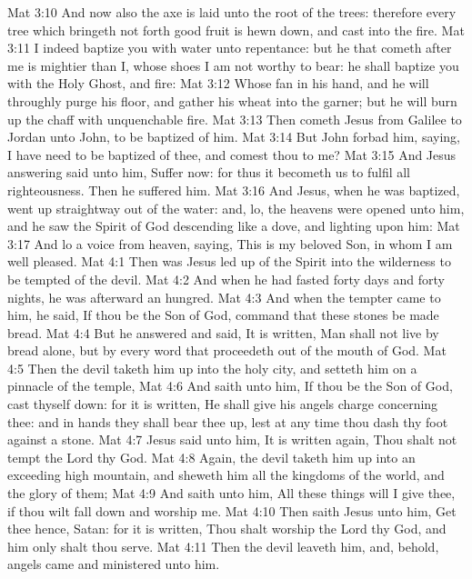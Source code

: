 \vs Mat 3:10 And now also the axe is laid unto the root of the trees: therefore every tree which bringeth not forth good fruit is hewn down, and cast into the fire.
\vs Mat 3:11 I indeed baptize you with water unto repentance: but he that cometh after me is mightier than I, whose shoes I am not worthy to bear: he shall baptize you with the Holy Ghost, and  fire:
\vs Mat 3:12 Whose fan  in his hand, and he will throughly purge his floor, and gather his wheat into the garner; but he will burn up the chaff with unquenchable fire.
\vs Mat 3:13 Then cometh Jesus from Galilee to Jordan unto John, to be baptized of him.
\vs Mat 3:14 But John forbad him, saying, I have need to be baptized of thee, and comest thou to me?
\vs Mat 3:15 And Jesus answering said unto him, Suffer  now: for thus it becometh us to fulfil all righteousness. Then he suffered him.
\vs Mat 3:16 And Jesus, when he was baptized, went up straightway out of the water: and, lo, the heavens were opened unto him, and he saw the Spirit of God descending like a dove, and lighting upon him:
\vs Mat 3:17 And lo a voice from heaven, saying, This is my beloved Son, in whom I am well pleased.
\vs Mat 4:1 Then was Jesus led up of the Spirit into the wilderness to be tempted of the devil.
\vs Mat 4:2 And when he had fasted forty days and forty nights, he was afterward an hungred.
\vs Mat 4:3 And when the tempter came to him, he said, If thou be the Son of God, command that these stones be made bread.
\vs Mat 4:4 But he answered and said, It is written, Man shall not live by bread alone, but by every word that proceedeth out of the mouth of God.
\vs Mat 4:5 Then the devil taketh him up into the holy city, and setteth him on a pinnacle of the temple,
\vs Mat 4:6 And saith unto him, If thou be the Son of God, cast thyself down: for it is written, He shall give his angels charge concerning thee: and in  hands they shall bear thee up, lest at any time thou dash thy foot against a stone.
\vs Mat 4:7 Jesus said unto him, It is written again, Thou shalt not tempt the Lord thy God.
\vs Mat 4:8 Again, the devil taketh him up into an exceeding high mountain, and sheweth him all the kingdoms of the world, and the glory of them;
\vs Mat 4:9 And saith unto him, All these things will I give thee, if thou wilt fall down and worship me.
\vs Mat 4:10 Then saith Jesus unto him, Get thee hence, Satan: for it is written, Thou shalt worship the Lord thy God, and him only shalt thou serve.
\vs Mat 4:11 Then the devil leaveth him, and, behold, angels came and ministered unto him.
